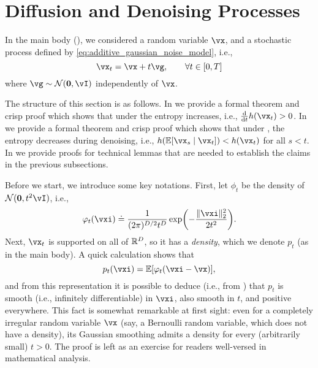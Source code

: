 \documentclass[../../book-main.tex]{subfiles}
\begin{document}
\section{Diffusion and Denoising Processes}\label{sec:entropy_diffusion}

In the main body (), we considered a random variable \(\vx\), and a stochastic process defined by \eqref{eq:additive_gaussian_noise_model}, i.e.,
\begin{equation}\label{eq:app_additive_gaussian_noise_model}
    \vx_{t} = \vx + t\vg, \qquad  \forall t \in [0, T]
\end{equation}
where \(\vg \sim \dNorm(\vzero, \vI)\) independently of \(\vx\). 

The structure of this section is as follows. In  we provide a formal theorem and crisp proof which shows that under  the entropy increases, i.e., \(\odv*{h(\vx_{t})}{t} > 0\). In  we provide a formal theorem and crisp proof which shows that under , the entropy decreases during denoising, i.e., \(h(\Ex[\vx_{s} \given \vx_{t}]) < h(\vx_{t})\) for all \(s < t\). In  we provide proofs for technical lemmas that are needed to establish the claims in the previous subsections.

Before we start, we introduce some key notations. First, let \(\phi_{t}\) be the density of \(\dNorm(\vzero, t^{2}\vI)\), i.e.,
\begin{equation}\label{eq:gaussian_noise_time_t}
    \phi_{t}(\vxi) \doteq \frac{1}{(2\pi)^{D/2}t^{D}}\exp\rp{-\frac{\norm{\vxi}_{2}^{2}}{2t^{2}}}.
\end{equation}
Next, \(\vx_{t}\) is supported on all of \(\mathbb{R}^{D}\), so it has a \textit{density}, which we denote \(p_{t}\) (as in the main body). A quick calculation shows that
\begin{equation}\label{eq:p_t_representation}
    p_{t}(\vxi) = \Ex[\phi_{t}(\vxi - \vx)],
\end{equation}
and from this representation it is possible to deduce (i.e., from ) that \(p_{t}\) is smooth (i.e., infinitely differentiable) in \(\vxi\), also smooth in \(t\), and positive everywhere. This fact is somewhat remarkable at first sight: even for a completely irregular random variable \(\vx\) (say, a Bernoulli random variable, which does not have a density), its Gaussian smoothing admits a density for every (arbitrarily small) \(t > 0\). The proof is left as an exercise for readers well-versed in mathematical analysis.
\end{document}
